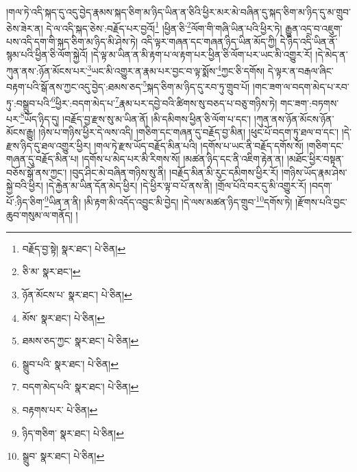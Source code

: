 །གལ་ཏེ་འདི་སྐད་དུ་འདུ་བྱེད་རྣམས་སྐད་ཅིག་མ་ཉིད་ཡིན་ན་ཅིའི་ཕྱིར་མར་མེ་བཞིན་དུ་སྐད་ཅིག་མ་ཉིད་དུ་མ་གྲུབ་ཅེས་ཟེར་ན། དེ་ལ་འདི་སྐད་ཅེས་:བརྗོད་པར་བྱའོ།\footnote{བརྗོད་བྱ་སྟེ།  སྣར་ཐང་།  པེ་ཅིན། } །ཕྱིན་ཅི་\footnote{ཅི་མ་  སྣར་ཐང་། }ལོག་གི་གཞི་ཡིན་པའི་ཕྱིར་ཏེ། རྒྱུན་འདྲ་བ་འཇུག་པས་འདི་དག་གི་སྐད་ཅིག་མ་ཉིད་མི་ཤེས་ཏེ། འདི་ལྟར་གཞན་དང་གཞན་ཉིད་ཡིན་མོད་ཀྱི། དེ་ཉིད་འདི་ཡིན་ནོ་སྙམ་པའི་ཕྱིན་ཅི་ལོག་སྐྱེའོ། །དེ་ལྟ་མ་ཡིན་ན་མི་རྟག་པ་ལ་རྟག་པར་ཕྱིན་ཅི་ལོག་པར་ཡང་མི་འགྱུར་རོ། །དེ་མེད་ན་ཀུན་ནས་:ཉོན་མོངས་པར་\footnote{ཉོན་མོངས་པ་  སྣར་ཐང་།  པེ་ཅིན། }ཡང་མི་འགྱུར་ན་རྣམ་པར་བྱང་བ་ལྟ་སྨོས་\footnote{མོས་  སྣར་ཐང་།  པེ་ཅིན། }ཀྱང་ཅི་དགོས། དེ་ལྟར་ན་བརྒལ་ཞིང་བརྟག་པའི་སྒོ་ནས་ཀྱང་འདུ་བྱེད་:ཐམས་ཅད་\footnote{ཐམས་ཅད་ཀྱང་  སྣར་ཐང་།  པེ་ཅིན། }སྐད་ཅིག་མ་ཉིད་དུ་རབ་ཏུ་གྲུབ་པོ། །གང་ཟག་ལ་བདག་མེད་པ་རབ་ཏུ་:བསྒྲུབ་པའི་\footnote{སྒྲུབ་པའི་  སྣར་ཐང་།  པེ་ཅིན། }ཕྱིར་:བདག་མེད་པ་\footnote{བདག་མེད་པའི་  སྣར་ཐང་།  པེ་ཅིན། }རྣམ་པར་དབྱེ་བའི་ཚིགས་སུ་བཅད་པ་བཅུ་གཉིས་ཏེ། གང་ཟག་:བཏགས་པར་\footnote{བརྟགས་པར་  པེ་ཅིན། }ཡོད་ཉིད་དུ། །བརྗོད་བྱ་རྫས་སུ་མ་ཡིན་ནོ། །མི་དམིགས་ཕྱིན་ཅི་ལོག་པ་དང་། །ཀུན་ནས་ཉོན་མོངས་ཉོན་མོངས་རྒྱུ། །ཉེས་པ་གཉིས་ཕྱིར་དེ་ལས་འདི། །གཅིག་དང་གཞན་དུ་བརྗོད་བྱ་མིན། །ཕུང་པོ་བདག་ཏུ་ཐལ་བ་དང་། །དེ་རྫས་ཉིད་དུ་ཐལ་འགྱུར་ཕྱིར། །གལ་ཏེ་རྫས་ཡོད་བརྗོད་མིན་པའི། །དགོས་པ་ཡང་ནི་བརྗོད་དགོས་སོ། །གཅིག་དང་གཞན་དུ་བརྗོད་མིན་པ། །དགོས་པ་མེད་པར་མི་རིགས་སོ། །མཚན་ཉིད་དང་ནི་འཇིག་རྟེན་ན། །མཐོང་ཕྱིར་བསྟན་བཅོས་སྒོ་ནས་ཀྱང་། །བུད་ཤིང་མེ་བཞིན་གཉིས་སུ་ནི། །བརྗོད་མིན་མི་རུང་དམིགས་ཕྱིར་རོ། །གཉིས་ཡོད་རྣམ་ཤེས་སྐྱེ་བའི་ཕྱིར། །དེ་རྐྱེན་མ་ཡིན་དོན་མེད་ཕྱིར། །དེ་ཕྱིར་ལྟ་བ་པོ་ནས་ནི། །གྲོལ་པོའི་བར་དུ་མི་འགྱུར་རོ། །བདག་པོ་:ཉིད་ཅིག་\footnote{ཉིད་གཅིག་  སྣར་ཐང་།  པེ་ཅིན། }ཡིན་ན་ནི། །མི་རྟག་མི་འདོད་འབྱུང་མི་བྱེད། །དེ་ལས་མཚན་ཉིད་གྲུབ་\footnote{སྒྲུབ་  སྣར་ཐང་།  པེ་ཅིན། }དགོས་ཏེ། །རྫོགས་པའི་བྱང་ཆུབ་གསུམ་ལ་གནོད། །
